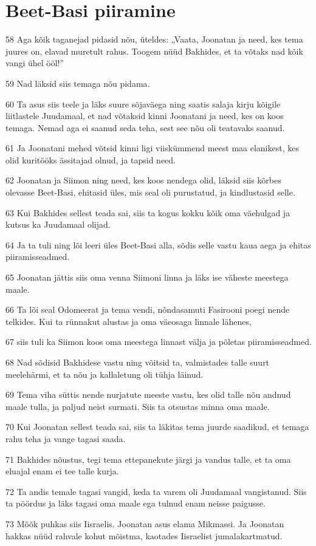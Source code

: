 \section*{Beet-Basi piiramine}

\par 58 Aga kõik taganejad pidasid nõu, üteldes: „Vaata, Joonatan ja need, kes tema juures on, elavad muretult rahus. Toogem nüüd Bakhides, et ta võtaks nad kõik vangi ühel ööl!”
\par 59 Nad läksid siis temaga nõu pidama.
\par 60 Ta asus siis teele ja läks suure sõjaväega ning saatis salaja kirju kõigile liitlastele Juudamaal, et nad võtaksid kinni Joonatani ja need, kes on koos temaga. Nemad aga ei saanud seda teha, sest see nõu oli teatavaks saanud.
\par 61 Ja Joonatani mehed võtsid kinni ligi viiskümmend meest maa elanikest, kes olid kuritööks ässitajad olnud, ja tapsid need.
\par 62 Joonatan ja Siimon ning need, kes koos nendega olid, läksid siis kõrbes olevasse Beet-Basi, ehitasid üles, mis seal oli purustatud, ja kindlustasid selle.
\par 63 Kui Bakhides sellest teada sai, siis ta kogus kokku kõik oma väehulgad ja kutsus ka Juudamaal olijad.
\par 64 Ja ta tuli ning lõi leeri üles Beet-Basi alla, sõdis selle vastu kaua aega ja ehitas piiramisseadmed.
\par 65 Joonatan jättis siis oma venna Siimoni linna ja läks ise väheste meestega maale.
\par 66 Ta lõi seal Odomeerat ja tema vendi, nõndasamuti Fasirooni poegi nende telkides. Kui ta rünnakut alustas ja oma väeosaga linnale lähenes,
\par 67 siis tuli ka Siimon koos oma meestega linnast välja ja põletas piiramisseadmed.
\par 68 Nad sõdisid Bakhidese vastu ning võitsid ta, valmistades talle suurt meelehärmi, et ta nõu ja kallaletung oli tühja läinud.
\par 69 Tema viha süttis nende nurjatute meeste vastu, kes olid talle nõu andnud maale tulla, ja paljud neist surmati. Siis ta otsustas minna oma maale.
\par 70 Kui Joonatan sellest teada sai, siis ta läkitas tema juurde saadikud, et temaga rahu teha ja vange tagasi saada.
\par 71 Bakhides nõustus, tegi tema ettepanekute järgi ja vandus talle, et ta oma eluajal enam ei tee talle kurja.
\par 72 Ta andis temale tagasi vangid, keda ta varem oli Juudamaal vangistanud. Siis ta pöördus ja läks tagasi oma maale ega tulnud enam neisse paigusse.
\par 73 Mõõk puhkas siis Iisraelis. Joonatan asus elama Mikmassi. Ja Joonatan hakkas nüüd rahvale kohut mõistma, kaotades Iisraelist jumalakartmatud.

